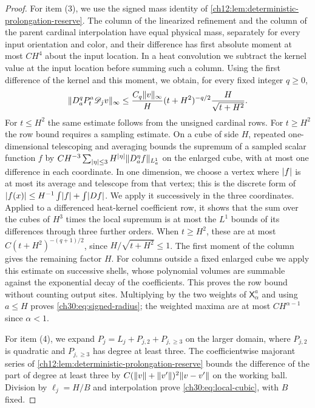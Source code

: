 \begin{proof}
For item (3), we use the signed mass identity of \cref{ch12:lem:deterministic-prolongation-reserve}. The column of the linearized refinement and the column of the parent cardinal interpolation have equal physical mass, separately for every input orientation and color, and their difference has first absolute moment at most $CH^4$ about the input location. In a heat convolution we subtract the kernel value at the input location before summing such a column. Using the first difference of the kernel and this moment, we obtain, for every fixed integer $q\ge0$,
\[
 \lVert D_a^qP_t^a\mathscr D_jv\rVert_\infty
 \le\frac{C_q\lVert v\rVert_\infty}{H}(t+H^2)^{-q/2}\frac{H}{\sqrt{t+H^2}} .
\]
For $t\le H^2$ the same estimate follows from the unsigned cardinal rows. For $t\ge H^2$ the row bound requires a sampling estimate. On a cube of side $H$, repeated one-dimensional telescoping and averaging bounds the supremum of a sampled scalar function $f$ by $CH^{-3}\sum_{\lvert \eta\rvert\le3}H^{\lvert \eta\rvert}\lVert D_a^\eta f\rVert_{L_a^1}$ on the enlarged cube, with at most one difference in each coordinate. In one dimension, we choose a vertex where $\lvert f\rvert$ is at most its average and telescope from that vertex; this is the discrete form of $\lvert f(x)\rvert\le H^{-1}\int\lvert f\rvert+\int\lvert Df\rvert$. We apply it successively in the three coordinates. Applied to a differenced heat-kernel coefficient row, it shows that the sum over the cubes of $H^3$ times the local supremum is at most the $L^1$ bounds of its differences through three further orders. When $t\ge H^2$, these are at most $C(t+H^2)^{-(q+1)/2}$, since $H/\sqrt{t+H^2}\le1$. The first moment of the column gives the remaining factor $H$. For columns outside a fixed enlarged cube we apply this estimate on successive shells, whose polynomial volumes are summable against the exponential decay of the coefficients. This proves the row bound without counting output sites. Multiplying by the two weights of $\mathsf X_\alpha^a$ and using $a\le H$ proves \eqref{ch30:eq:signed-radius}; the weighted maxima are at most $CH^{\alpha-1}$ since $\alpha<1$.

For item (4), we expand $P_j=L_j+P_{j,2}+P_{j,\ge3}$ on the larger domain, where $P_{j,2}$ is quadratic and $P_{j,\ge3}$ has degree at least three. The coefficientwise majorant series of \cref{ch12:lem:deterministic-prolongation-reserve} bounds the difference of the part of degree at least three by $C(\lVert v\rVert+\lVert v'\rVert)^2\lVert v-v'\rVert$ on the working ball. Division by $\ell_j=H/B$ and interpolation prove \eqref{ch30:eq:local-cubic}, with $B$ fixed.


\end{proof}
